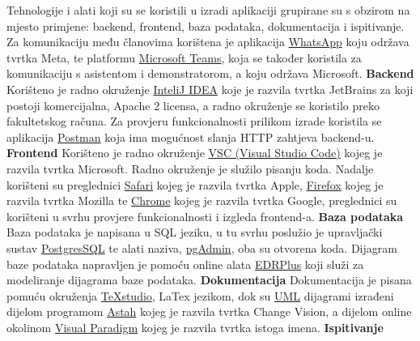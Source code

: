 			 Tehnologije i alati koji su se koristili u izradi aplikaciji grupirane su s obzirom na mjesto primjene: backend, frontend, baza podataka, dokumentacija i ispitivanje. Za komunikaciju među članovima korištena je aplikacija \href{https://www.whatsapp.com/}{WhatsApp} koju održava tvrtka Meta, te platformu \href{https://support.microsoft.com/en-us/topic/what-is-microsoft-teams-3de4d369-0167-8def-b93b-0eb5286d7a29}{Microsoft Teams}, koja se također koristila za komunikaciju s asistentom i demonstratorom, a koju održava Microsoft.
			 \newline \textbf{Backend} \newline
			 Korišteno je radno okruženje \href{https://www.jetbrains.com/idea/}{InteliJ IDEA}  koje je razvila tvrtka JetBrains za koji postoji komercijalna, Apache 2 licensa, a radno okruženje se koristilo preko fakultetskog računa. Za provjeru funkcionalnosti prilikom izrade koristila se aplikacija \href{https://www.postman.com/}{Postman} koja ima mogućnost slanja HTTP zahtjeva backend-u. 
			 \newline \textbf{Frontend} \newline
			 Korišteno je radno okruženje \href{https://code.visualstudio.com/download}{VSC (Visual Studio Code)} kojeg je razvila tvrtka Microsoft. Radno okruženje je služilo pisanju koda. Nadalje korišteni su preglednici \href{https://www.apple.com/safari/}{Safari} kojeg je razvila tvrtka Apple, \href{https://www.mozilla.org/en-US/firefox/new/}{Firefox} kojeg je razvila tvrtka Mozilla te \href{https://www.google.com/chrome/}{Chrome} kojeg je razvila tvrtka Google, preglednici su korišteni u svrhu provjere funkcionalnosti i izgleda frontend-a.
			 \newline \textbf{Baza podataka} \newline
			 Baza podataka je napisana u SQL jeziku, u tu svrhu poslužio je upravljački sustav \href{https://www.postgresql.org/}{PostgresSQL} te alati naziva,  \href{https://www.pgadmin.org/}{pgAdmin}, oba su otvorena koda. Dijagram baze podataka napravljen je pomoću online alata \href{https://erdplus.com/}{EDRPlus} koji služi za modeliranje dijagrama baze podataka.
			 \newline \textbf{Dokumentacija} \newline
			 Dokumentacija je pisana pomuću okruženja \href{https://www.texstudio.org/}{TeXstudio}, LaTex jezikom, dok su \href{https://www.uml-diagrams.org/}{UML} dijagrami izrađeni dijelom programom \href{https://astah.net/}{Astah} kojeg je razvila tvrtka Change Vision, a dijelom online okolinom \href{https://www.visual-paradigm.com/}{Visual Paradigm} kojeg je razvila tvrtka istoga imena.
			 \newline \textbf{Ispitivanje} \newline
			 
